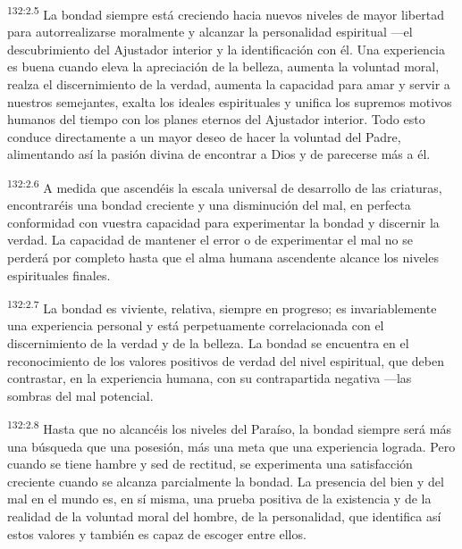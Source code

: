 \par 
\textsuperscript{132:2.5} La bondad siempre está creciendo hacia nuevos niveles de mayor libertad para autorrealizarse moralmente y alcanzar la personalidad espiritual ---el descubrimiento del Ajustador interior y la identificación con él. Una experiencia es buena cuando eleva la apreciación de la belleza, aumenta la voluntad moral, realza el discernimiento de la verdad, aumenta la capacidad para amar y servir a nuestros semejantes, exalta los ideales espirituales y unifica los supremos motivos humanos del tiempo con los planes eternos del Ajustador interior. Todo esto conduce directamente a un mayor deseo de hacer la voluntad del Padre, alimentando así la pasión divina de encontrar a Dios y de parecerse más a él.

\par 
\textsuperscript{132:2.6} A medida que ascendéis la escala universal de desarrollo de las criaturas, encontraréis una bondad creciente y una disminución del mal, en perfecta conformidad con vuestra capacidad para experimentar la bondad y discernir la verdad. La capacidad de mantener el error o de experimentar el mal no se perderá por completo hasta que el alma humana ascendente alcance los niveles espirituales finales.

\par 
\textsuperscript{132:2.7} La bondad es viviente, relativa, siempre en progreso; es invariablemente una experiencia personal y está perpetuamente correlacionada con el discernimiento de la verdad y de la belleza. La bondad se encuentra en el reconocimiento de los valores positivos de verdad del nivel espiritual, que deben contrastar, en la experiencia humana, con su contrapartida negativa ---las sombras del mal potencial.

\par 
\textsuperscript{132:2.8} Hasta que no alcancéis los niveles del Paraíso, la bondad siempre será más una búsqueda que una posesión, más una meta que una experiencia lograda. Pero cuando se tiene hambre y sed de rectitud, se experimenta una satisfacción creciente cuando se alcanza parcialmente la bondad. La presencia del bien y del mal en el mundo es, en sí misma, una prueba positiva de la existencia y de la realidad de la voluntad moral del hombre, de la personalidad, que identifica así estos valores y también es capaz de escoger entre ellos.

